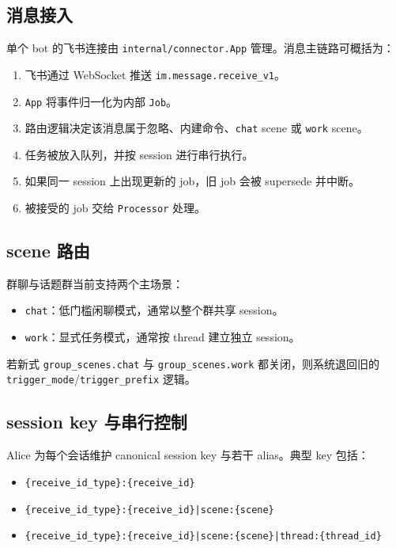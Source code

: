 \documentclass[12pt,a4paper]{ctexart}
\begin{document}
\subsection{消息接入}

单个 bot 的飞书连接由 \texttt{internal/connector.App} 管理。消息主链路可概括为：

\begin{enumerate}
  \item 飞书通过 WebSocket 推送 \texttt{im.message.receive\_v1}。
  \item \texttt{App} 将事件归一化为内部 \texttt{Job}。
  \item 路由逻辑决定该消息属于忽略、内建命令、\texttt{chat} scene 或 \texttt{work} scene。
  \item 任务被放入队列，并按 session 进行串行执行。
  \item 如果同一 session 上出现更新的 job，旧 job 会被 supersede 并中断。
  \item 被接受的 job 交给 \texttt{Processor} 处理。
\end{enumerate}

\subsection{scene 路由}

群聊与话题群当前支持两个主场景：

\begin{itemize}
  \item \texttt{chat}：低门槛闲聊模式，通常以整个群共享 session。
  \item \texttt{work}：显式任务模式，通常按 thread 建立独立 session。
\end{itemize}

若新式 \texttt{group\_scenes.chat} 与 \texttt{group\_scenes.work} 都关闭，则系统退回旧的 \texttt{trigger\_mode}/\texttt{trigger\_prefix} 逻辑。

\subsection{session key 与串行控制}

Alice 为每个会话维护 canonical session key 与若干 alias。典型 key 包括：

\begin{itemize}
  \item \texttt{\{receive\_id\_type\}:\{receive\_id\}}
  \item \texttt{\{receive\_id\_type\}:\{receive\_id\}|scene:\{scene\}}
  \item \texttt{\{receive\_id\_type\}:\{receive\_id\}|scene:\{scene\}|thread:\{thread\_id\}}
\end{itemize}
\end{document}

